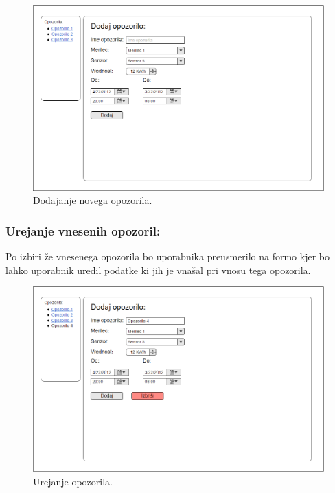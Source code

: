 \documentclass[12pt,a4paper,titlepage,openany]{report}
\begin{document}
\begin{figure}[H]
\begin{center}
\includegraphics[width=1\linewidth]{Slike/DodajOpozorilo.png}
\end{center}
\caption{Dodajanje novega opozorila.}\label{slika:DodajOpozorilo}
\end{figure}

\subsubsection{Urejanje vnesenih opozoril:}
Po izbiri že vnesenega opozorila bo uporabnika preusmerilo na formo kjer bo lahko uporabnik uredil podatke ki jih je vnašal pri vnosu tega opozorila.

\begin{figure}[H]
\begin{center}
\includegraphics[width=1\linewidth]{Slike/UrediOpozorilo.png}
\end{center}
\caption{Urejanje opozorila.}\label{slika:UrediOpozorilo}
\end{figure}
\end{document}
